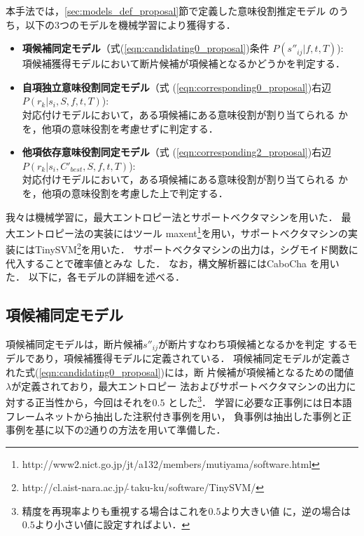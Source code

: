 \documentclass[japanese]{jnlp_1.2b}
\begin{document}
本手法では，\ref{sec:models_def_proposal}節で定義した意味役割推定モデル
のうち，以下の3つのモデルを機械学習により獲得する．
\begin{itemize}
 \item {\bf 項候補同定モデル}（式(\ref{eqn:candidating0_proposal})条件
       $P(s''_{ij}|f,t,T)$):\\
       項候補獲得モデルにおいて断片候補が項候補となるかどうかを判定する．
 \item {\bf 自項独立意味役割同定モデル}（式
       (\ref{eqn:corresponding0_proposal})右辺
       $P(r_{k}|s_{i},S,f,t,T)$):\\
       対応付けモデルにおいて，ある項候補にある意味役割が割り当てられる
       かを，他項の意味役割を考慮せずに判定する．
 \item {\bf 他項依存意味役割同定モデル}（式
       (\ref{eqn:corresponding2_proposal})右辺
       $P(r_{k}|s_{i},C'_{best},S,f,t,T)$):\\
       対応付けモデルにおいて，ある項候補にある意味役割が割り当てられる
       かを，他項の意味役割を考慮した上で判定する．
\end{itemize}

我々は機械学習に，最大エントロピー法とサポートベクタマシンを用いた．
最大エントロピー法の実装にはツール
maxent\footnote{http://www2.nict.go.jp/jt/a132/members/mutiyama/software.html}を用い，サポートベクタマシンの実装にはTinySVM\footnote{http://cl.aist-nara.ac.jp/$\tilde{~}$taku-ku/software/TinySVM/}を用いた．
サポートベクタマシンの出力は，シグモイド関数に代入することで確率値とみな
した\cite{pradhan04}．
なお，構文解析器にはCaboCha \cite{kudo02_cabocha}を用いた．
以下に，各モデルの詳細を述べる．


\subsection{項候補同定モデル}
\label{sec:proposal_argument}

項候補同定モデルは，断片候補$s''_{ij}$が断片すなわち項候補となるかを判定
するモデルであり，項候補獲得モデルに定義されている．
項候補同定モデルが定義された式(\ref{eqn:candidating0_proposal})には，断
片候補が項候補となるための閾値$\lambda$が定義されており，最大エントロピー
法およびサポートベクタマシンの出力に対する正当性から，今回はそれを$0.5$
とした\footnote{精度を再現率よりも重視する場合はこれを$0.5$より大きい値
に，逆の場合は$0.5$より小さい値に設定すればよい．}．
学習に必要な正事例には日本語フレームネットから抽出した注釈付き事例を用い，
負事例は抽出した事例と正事例を基に以下の2通りの方法を用いて準備した．
\end{document}
